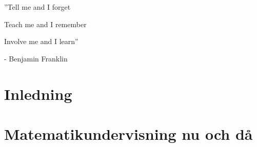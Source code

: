 \documentclass[11pt,a4paper]{article}
\begin{document}



\newpage

\begin{centering}
\Huge
''Tell me and I forget 

Teach me and I remember

Involve me and I learn''

\end{centering}
\bigskip
\begin{centering}

\Large
- Benjamin Franklin

\end{centering}
\newpage

\renewcommand\abstractname{Sammandrag}\begin{abstract}

\end{abstract}

\newpage

\renewcommand\abstractname{Abstract}
\begin{abstract} 

\end{abstract}

\newpage
 
\tableofcontents

\newpage
{}


\section{Inledning}
    

\section{Matematikundervisning nu och då}
    
    \label{sec:Bakgrund}
    
    
\end{document}
